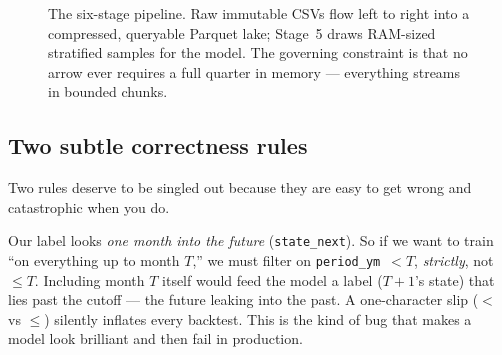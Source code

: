 \documentclass[11pt]{article}
\begin{document}
\begin{figure}[H]
\centering
{}
\caption{The six-stage pipeline. Raw immutable CSVs flow left to right into a compressed,
queryable Parquet lake; Stage~5 draws RAM-sized stratified samples for the model. The
governing constraint is that no arrow ever requires a full quarter in memory --- everything
streams in bounded chunks.}
\end{figure}

\subsection{Two subtle correctness rules}

Two rules deserve to be singled out because they are easy to get wrong and catastrophic
when you do.

\begin{intuition}
Our label looks \emph{one month into the future} (\texttt{state\_next}). So if we want to
train ``on everything up to month $T$,'' we must filter on \texttt{period\_ym}~$<T$,
\emph{strictly}, not~$\le T$. Including month $T$ itself would feed the model a label
($T{+}1$'s state) that lies past the cutoff --- the future leaking into the past. A
one-character slip ($<$ vs $\le$) silently inflates every backtest. This is the kind of
bug that makes a model look brilliant and then fail in production.
\end{intuition}
\end{document}

